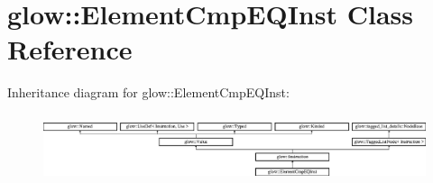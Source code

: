 \hypertarget{classglow_1_1_element_cmp_e_q_inst}{}\section{glow\+:\+:Element\+Cmp\+E\+Q\+Inst Class Reference}
\label{classglow_1_1_element_cmp_e_q_inst}
Inheritance diagram for glow\+:\+:Element\+Cmp\+E\+Q\+Inst\+:\begin{figure}[H]
\begin{center}
\leavevmode
\includegraphics[height=1.991111cm]{classglow_1_1_element_cmp_e_q_inst}
\end{center}
\end{figure}
